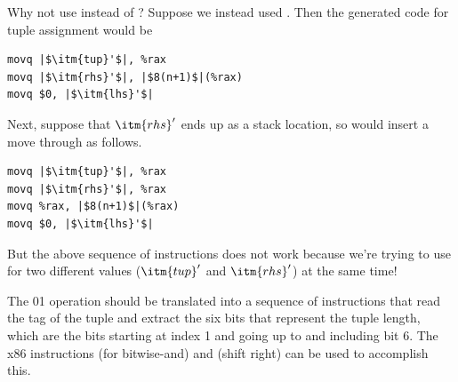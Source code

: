\documentclass[7x10]{TimesAPriori_MIT}%
\def\racketEd{0}
\def\pythonEd{1}
\def\edition{1}
\newcommand{\racket}[1]{{\if\edition\racketEd{#1}\fi}}
\newcommand{\python}[1]{{\if\edition\pythonEd #1\fi}}
\begin{document}
Why not use  instead of ? Suppose we instead used
. Then the generated code for tuple assignment would be
\begin{lstlisting}
movq |$\itm{tup}'$|, %rax
movq |$\itm{rhs}'$|, |$8(n+1)$|(%rax)
movq $0, |$\itm{lhs}'$|
\end{lstlisting}
Next, suppose that $\itm{rhs}'$ ends up as a stack location, so
 would insert a move through 
as follows.
\begin{lstlisting}
movq |$\itm{tup}'$|, %rax
movq |$\itm{rhs}'$|, %rax
movq %rax, |$8(n+1)$|(%rax)
movq $0, |$\itm{lhs}'$|
\end{lstlisting}
But the above sequence of instructions does not work because we're
trying to use  for two different values ($\itm{tup}'$ and
$\itm{rhs}'$) at the same time!

The \racket{}\python{} operation should
be translated into a sequence of instructions that read the tag of the
tuple and extract the six bits that represent the tuple length, which
are the bits starting at index 1 and going up to and including bit 6.
The x86 instructions  (for bitwise-and) and 
(shift right) can be used to accomplish this.
\end{document}
